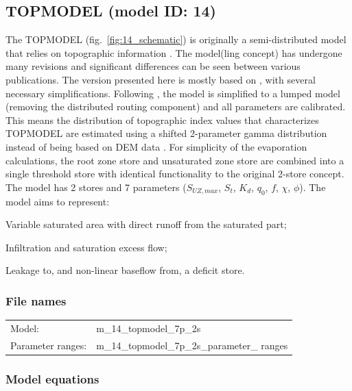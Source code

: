 \subsection{TOPMODEL (model ID: 14)}
The TOPMODEL (fig.~\ref{fig:14_schematic}) is originally a semi-distributed model that relies on topographic information \citep{BEVEN1979}. 
The model(ling concept) has undergone many revisions and significant differences can be seen between various publications. 
The version presented here is mostly based on \citet{Beven1995}, with several necessary simplifications. 
Following \citet{Clark2008a}, the model is simplified to a lumped model (removing the distributed routing component) and all parameters are calibrated. 
This means the distribution of topographic index values that characterizes TOPMODEL are estimated using a shifted 2-parameter gamma distribution instead of being based on DEM data \citep{Sivapalan1987,Clark2008a}. 
For simplicity of the evaporation calculations, the root zone store and unsaturated zone store are combined into a single threshold store with identical functionality to the original 2-store concept. 
The model has 2 stores and 7 parameters ($S_{UZ,max}$, $S_t$, $K_d$, $q_0$, $f$, $\chi$, $\phi$). 
The model aims to represent:

\begin{itemizecompact}
\item Variable saturated area with direct runoff from the saturated part;
\item Infiltration and saturation excess flow;
\item Leakage to, and non-linear baseflow from, a deficit store.
\end{itemizecompact}

\subsubsection{File names}
\begin{tabular}{@{}ll}
Model: &m\_14\_topmodel\_7p\_2s \\
Parameter ranges: &m\_14\_topmodel\_7p\_2s\_parameter\_ ranges \\
\end{tabular}

\subsubsection{Model equations}

